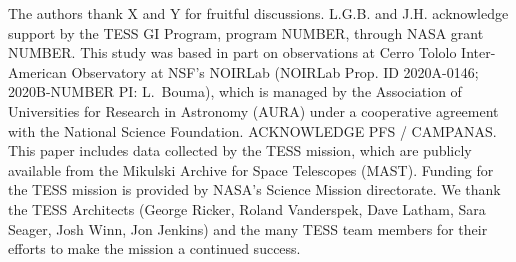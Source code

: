 \documentclass[12pt,twocolumn,tighten]{aastex63}
\begin{document}


\acknowledgements
\raggedbottom

The authors thank X and Y for fruitful discussions.
%
L.G.B. and J.H. acknowledge support by the TESS GI Program, program
NUMBER, through NASA grant NUMBER.
%
This study was based in part on observations at Cerro Tololo
Inter-American Observatory at NSF's NOIRLab (NOIRLab Prop. ID
2020A-0146; 2020B-NUMBER PI: L{.}~Bouma), which is managed by the
Association of Universities for Research in Astronomy (AURA) under a
cooperative agreement with the National Science Foundation.
%
ACKNOWLEDGE PFS / CAMPANAS.
%
This paper includes data collected by the TESS mission, which are
publicly available from the Mikulski Archive for Space Telescopes
(MAST).
%
Funding for the TESS mission is provided by NASA's Science Mission
directorate.
%
We thank the TESS Architects (George Ricker, Roland Vanderspek, Dave
Latham, Sara Seager, Josh Winn, Jon Jenkins) and the many TESS team
members for their efforts to make the mission a continued success.
%

%
%


%
\end{document}
